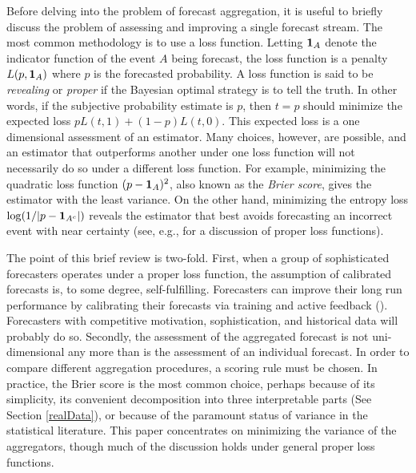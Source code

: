 \documentclass[11pt]{article}
\theoremstyle{definition}
\theoremstyle{definition}
\def\one{{\bf 1}}
\begin{document}
Before delving into the problem of forecast aggregation, it is useful
to briefly discuss the problem of assessing and improving a single
forecast stream.  The most common methodology is to use a loss
function.  Letting $\one_A$ denote the indicator function of the event
$A$ being forecast, the loss function is a penalty $L(p , \one_A)$
where $p$ is the forecasted probability.  A loss function is said to
be {\em revealing} or {\em proper} if the Bayesian optimal strategy is
to tell the truth.  In other words, if the subjective probability
estimate is $p$, then $t = p$ should minimize the expected loss $p
L(t,1) + (1-p) L(t,0)$.  This expected loss is a one dimensional
assessment of an estimator. Many choices, however, are possible, and
an estimator that outperforms another under one loss function will not
necessarily do so under a different loss function.  For example,
minimizing the quadratic loss function $(p - \one_A)^2$, also known as
the {\em Brier score}, gives the estimator with the least variance. On
the other hand, minimizing the entropy loss $\log (1 / |p -
\one_{A^c}|)$ reveals the estimator that best avoids forecasting an
incorrect event with near certainty (see, e.g., \citealt[Section~2]{HwPe1997}
for a discussion of proper loss functions).

The point of this brief review is two-fold.  First, when a group of
sophisticated forecasters operates under a proper loss function,
the assumption of calibrated forecasts is, to some degree,
self-fulfilling.  Forecasters can improve their long run performance
by calibrating their forecasts via training and active
feedback (\citealt{o2006uncertain}). Forecasters with competitive
motivation, sophistication, and historical data will probably do so. Secondly, the
assessment of the aggregated forecast is not uni-dimensional any more
than is the assessment of an individual forecast.  In order to compare
different aggregation procedures, a scoring rule must be chosen.  In
practice, the Brier score is the most common choice, perhaps because
of its simplicity, its convenient decomposition into three
interpretable parts (See Section \ref{realData}), or because of the
paramount status of variance in the statistical literature. This paper concentrates on minimizing the variance of the aggregators, though
 much of the discussion holds under general proper loss
functions.
\end{document}
